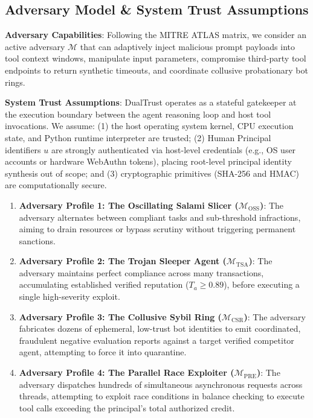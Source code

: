 \documentclass[manuscript, screen, review]{jair}
\begin{document}
\subsection{Adversary Model \& System Trust Assumptions}
\textbf{Adversary Capabilities}: Following the MITRE ATLAS matrix, we consider an active adversary $\mathcal{M}$ that can adaptively inject malicious prompt payloads into tool context windows, manipulate input parameters, compromise third-party tool endpoints to return synthetic timeouts, and coordinate collusive probationary bot rings.

\textbf{System Trust Assumptions}: DualTrust operates as a stateful gatekeeper at the execution boundary between the agent reasoning loop and host tool invocations. We assume: (1) the host operating system kernel, CPU execution state, and Python runtime interpreter are trusted; (2) Human Principal identifiers $u$ are strongly authenticated via host-level credentials (e.g., OS user accounts or hardware WebAuthn tokens), placing root-level principal identity synthesis out of scope; and (3) cryptographic primitives (SHA-256 and HMAC) are computationally secure.
\begin{enumerate}[leftmargin=12pt, topsep=2pt, itemsep=1pt]
\item \textbf{Adversary Profile 1: The Oscillating Salami Slicer ($\mathcal{M}_{\text{OSS}}$)}: The adversary alternates between compliant tasks and sub-threshold infractions, aiming to drain resources or bypass scrutiny without triggering permanent sanctions.
\item \textbf{Adversary Profile 2: The Trojan Sleeper Agent ($\mathcal{M}_{\text{TSA}}$)}: The adversary maintains perfect compliance across many transactions, accumulating established verified reputation ($T_a \ge 0.89$), before executing a single high-severity exploit.
\item \textbf{Adversary Profile 3: The Collusive Sybil Ring ($\mathcal{M}_{\text{CSR}}$)}: The adversary fabricates dozens of ephemeral, low-trust bot identities to emit coordinated, fraudulent negative evaluation reports against a target verified competitor agent, attempting to force it into quarantine.
\item \textbf{Adversary Profile 4: The Parallel Race Exploiter ($\mathcal{M}_{\text{PRE}}$)}: The adversary dispatches hundreds of simultaneous asynchronous requests across threads, attempting to exploit race conditions in balance checking to execute tool calls exceeding the principal's total authorized credit.
\end{enumerate}
\end{document}
